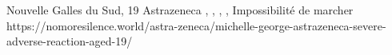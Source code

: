                 {
                  Nouvelle Galles du Sud, 
                }
                {
                  19
                }
                {
                  Astrazeneca
                }
                {
                }
                {
                  ,
                  ,
                  ,
                  ,
                  Impossibilité de marcher
                }
                {
                  https://nomoresilence.world/astra-zeneca/michelle-george-astrazeneca-severe-adverse-reaction-aged-19/
                }
